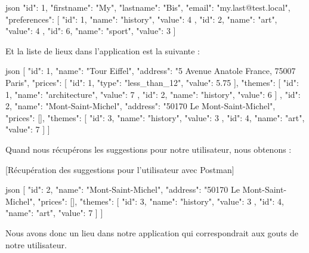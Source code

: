 \documentclass[big]{zmdocument}
\begin{document}
\begin{CodeBlock}{json}
{
  "id": 1,
  "firstname": "My",
  "lastname": "Bis",
  "email": "my.last@test.local",
  "preferences": [
    {
      "id": 1,
      "name": "history",
      "value": 4
    },
    {
      "id": 2,
      "name": "art",
      "value": 4
    },
    {
      "id": 6,
      "name": "sport",
      "value": 3
    }
  ]
}
\end{CodeBlock}



Et la liste de lieux dans l'application est la suivante :



\begin{CodeBlock}{json}
[
  {
    "id": 1,
    "name": "Tour Eiffel",
    "address": "5 Avenue Anatole France, 75007 Paris",
    "prices": [
      {
        "id": 1,
        "type": "less_than_12",
        "value": 5.75
      }
    ],
    "themes": [
      {
        "id": 1,
        "name": "architecture",
        "value": 7
      },
      {
        "id": 2,
        "name": "history",
        "value": 6
      }
    ]
  },
  {
    "id": 2,
    "name": "Mont-Saint-Michel",
    "address": "50170 Le Mont-Saint-Michel",
    "prices": [],
    "themes": [
      {
        "id": 3,
        "name": "history",
        "value": 3
      },
      {
        "id": 4,
        "name": "art",
        "value": 7
      }
    ]
  }
]
\end{CodeBlock}



Quand nous récupérons les suggestions pour notre utilisateur, nous obtenons :



[Récupération des suggestions pour l'utilisateur avec Postman]


\begin{CodeBlock}{json}
[
  {
    "id": 2,
    "name": "Mont-Saint-Michel",
    "address": "50170 Le Mont-Saint-Michel",
    "prices": [],
    "themes": [
      {
        "id": 3,
        "name": "history",
        "value": 3
      },
      {
        "id": 4,
        "name": "art",
        "value": 7
      }
    ]
  }
]
\end{CodeBlock}



Nous avons donc un lieu dans notre application qui correspondrait aux gouts de notre utilisateur.
\end{document}
